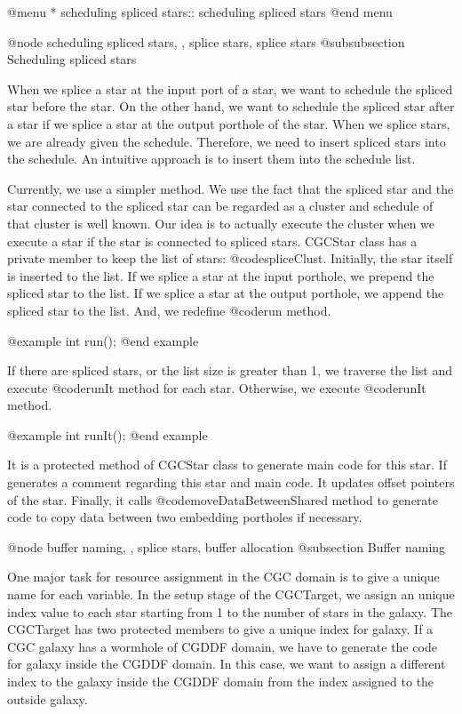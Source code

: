 {@menu
* scheduling spliced stars::		scheduling spliced stars
@end menu

@node scheduling spliced stars, , splice stars, splice stars
@subsubsection Scheduling spliced stars

When we splice a star at the input port of a star, we want to
schedule the spliced star before the star. On the other hand, we want
to schedule the spliced star after a star if we splice a star at the
output porthole of the star. When we splice stars, we are already given
the schedule. Therefore, we need to insert spliced stars into the
schedule. An intuitive approach is to insert them into the schedule list.

Currently, we use a simpler method. We use the fact that the spliced
star and the star connected to the spliced star can be regarded as a
cluster and schedule of that cluster is well known. Our idea is to
actually execute the cluster when we execute a star if the star is connected
to spliced stars. CGCStar class has a private member to keep the
list of stars: @code{spliceClust}. Initially, the star itself is
inserted to the list. If we splice a star at the input porthole, we
prepend the spliced star to the list. If we splice a star at the output
porthole, we append the spliced star to the list. And, we redefine
@code{run} method.

@example
int run();
@end example

If there are spliced stars, or the list size is greater than 1, we
traverse the list and execute @code{runIt} method for each star. Otherwise,
we execute @code{runIt} method.

@example
int runIt();
@end example

It is a protected method of CGCStar class to generate main code for this
star. If generates a comment regarding this star and main code. It updates
offset pointers of the star. Finally, it calls @code{moveDataBetweenShared}
method to generate code to copy data between two embedding portholes if
necessary.

@node buffer naming, , splice stars, buffer allocation
@subsection Buffer naming

One major task for resource assignment in the CGC domain is to give
a unique name for each variable. In the setup stage of the CGCTarget,
we assign an unique index value to each star starting from 1 to the number
of stars in the galaxy. The CGCTarget has two protected members to
give a unique index for galaxy. If a CGC galaxy has a wormhole of
CGDDF domain, we have to generate the code for galaxy inside the CGDDF
domain. In this case, we want to assign a different index to the galaxy
inside the CGDDF domain from the index assigned to the outside galaxy.

}
